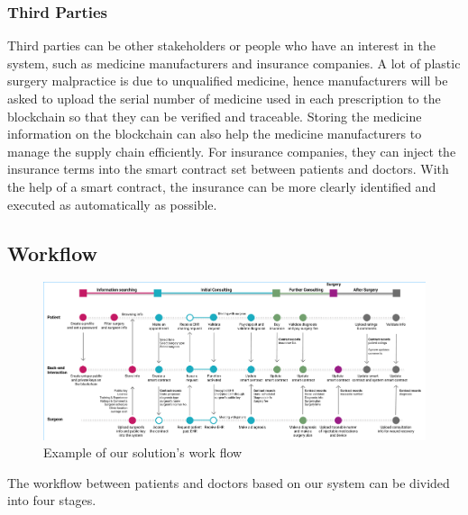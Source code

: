 \documentclass{article}
\begin{document}
\subsubsection{Third Parties}
Third parties can be other stakeholders or people who have an interest in the system, such as medicine manufacturers and insurance companies. A lot of plastic surgery malpractice is due to unqualified medicine, hence manufacturers will be asked to upload the serial number of medicine used in each prescription to the blockchain so that they can be verified and traceable. Storing the medicine information on the blockchain can also help the medicine manufacturers to manage the supply chain efficiently. For insurance companies, they can inject the insurance terms into the smart contract set between patients and doctors. With the help of a smart contract, the insurance can be more clearly identified and executed as automatically as possible.
\subsection{Workflow}
\begin{figure}[H]
    \centering
    \includegraphics[scale=0.45]{Workflow.jpg}
    \caption{Example of our solution's work flow}
\end{figure}
The workflow between patients and doctors based on our system can be divided into four stages.
\end{document}
